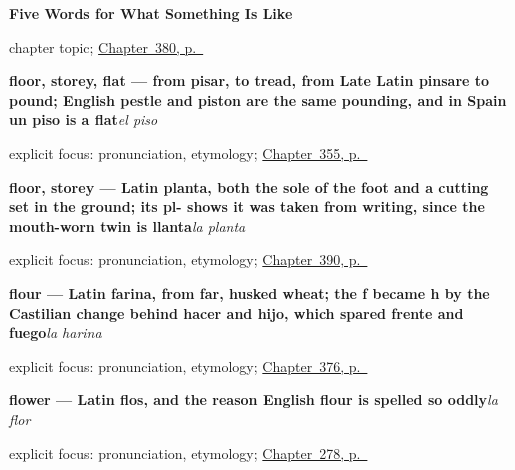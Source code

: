 \noindent\begin{minipage}[t]{\linewidth}
\raggedright
\textbf{Five Words for What Something Is Like}\par
\footnotesize chapter topic; \hyperref[ch:simpatico-y-alegre]{Chapter~380, p.~\pageref*{ch:simpatico-y-alegre}}
\end{minipage}\par\smallskip

\noindent\begin{minipage}[t]{\linewidth}
\raggedright
\textbf{floor, storey, flat — from pisar, to tread, from Late Latin pinsare to pound; English pestle and piston are the same pounding, and in Spain un piso is a flat}\enspace\emph{el piso}\par
\footnotesize explicit focus: pronunciation, etymology; \hyperref[ch:la-pared-y-el-techo]{Chapter~355, p.~\pageref*{ch:la-pared-y-el-techo}}
\end{minipage}\par\smallskip

\noindent\begin{minipage}[t]{\linewidth}
\raggedright
\textbf{floor, storey — Latin planta, both the sole of the foot and a cutting set in the ground; its pl- shows it was taken from writing, since the mouth-worn twin is llanta}\enspace\emph{la planta}\par
\footnotesize explicit focus: pronunciation, etymology; \hyperref[ch:la-terraza-y-la-sala]{Chapter~390, p.~\pageref*{ch:la-terraza-y-la-sala}}
\end{minipage}\par\smallskip

\noindent\begin{minipage}[t]{\linewidth}
\raggedright
\textbf{flour — Latin farina, from far, husked wheat; the f became h by the Castilian change behind hacer and hijo, which spared frente and fuego}\enspace\emph{la harina}\par
\footnotesize explicit focus: pronunciation, etymology; \hyperref[ch:la-harina-y-la-uva]{Chapter~376, p.~\pageref*{ch:la-harina-y-la-uva}}
\end{minipage}\par\smallskip

\noindent\begin{minipage}[t]{\linewidth}
\raggedright
\textbf{flower — Latin flos, and the reason English flour is spelled so oddly}\enspace\emph{la flor}\par
\footnotesize explicit focus: pronunciation, etymology; \hyperref[ch:al-aire-libre]{Chapter~278, p.~\pageref*{ch:al-aire-libre}}
\end{minipage}\par\smallskip


